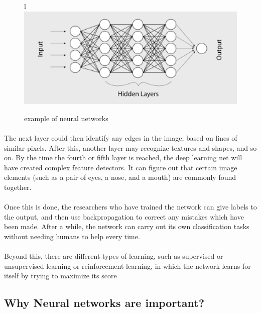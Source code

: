 \begin{figure}{l}
	\centering
	\includegraphics[width=1.0\textwidth]{CH1-introduction/sec3_neural_networks/nn.png}
	\caption{example of neural networks}
\end{figure} 

\paragraph{}
The next layer could then identify any edges in the image, based on lines of similar pixels. After this, another layer may recognize textures and shapes, and so on. By the time the fourth or fifth layer is reached, the deep learning net will have created complex feature detectors. It can figure out that certain image elements (such as a pair of eyes, a nose, and a mouth) are commonly found together.
\paragraph{}
Once this is done, the researchers who have trained the network can give labels to the output, and then use backpropagation to correct any mistakes which have been made. After a while, the network can carry out its own classification tasks without needing humans to help every time.
\paragraph{}
Beyond this, there are different types of learning, such as supervised or unsupervised learning or reinforcement learning, in which the network learns for itself by trying to maximize its score

\subsection{Why Neural networks are important? }
